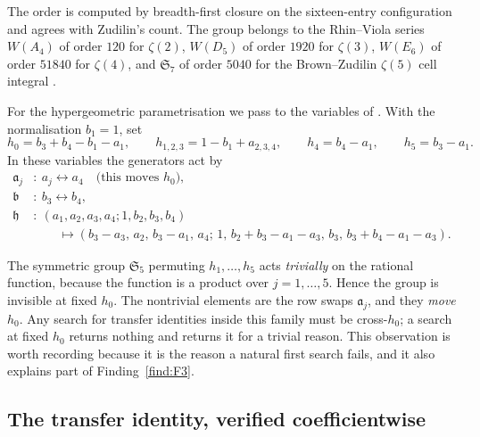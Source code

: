 The order is computed by breadth-first closure on the sixteen-entry configuration and agrees
with Zudilin's count. The group belongs to the Rhin--Viola series $W(A_4)$ of order $120$
for $\zeta(2)$, $W(D_5)$ of order $1920$ for $\zeta(3)$, $W(E_6)$ of order $51840$ for
$\zeta(4)$, and $\mathfrak S_7$ of order $5040$ for the Brown--Zudilin $\zeta(5)$ cell
integral \cite{BrownZudilin2022}.

For the hypergeometric parametrisation we pass to the variables of \cite[\S4]{Zudilin2004}.
With the normalisation $b_1=1$, set
\begin{equation}\label{eq:hvars}
 h_0=b_3+b_4-b_1-a_1,\qquad h_{1,2,3}=1-b_1+a_{2,3,4},\qquad
 h_4=b_4-a_1,\qquad h_5=b_3-a_1 .
\end{equation}
In these variables the generators act by
\begin{equation}\label{eq:hact}
\begin{aligned}
 \mathfrak a_j &:\ a_j\leftrightarrow a_4 \quad\text{(this moves }h_0\text{)},\\
 \mathfrak b &:\ b_3\leftrightarrow b_4,\\
 \mathfrak h &:\ (a_1,a_2,a_3,a_4;1,b_2,b_3,b_4)\\
 &\qquad\mapsto
   (b_3-a_3,\,a_2,\,b_3-a_1,\,a_4;\,1,\,b_2+b_3-a_1-a_3,\,b_3,\,b_3+b_4-a_1-a_3).
\end{aligned}
\end{equation}

\begin{remark}\label{rem:S5trivial}
The symmetric group $\mathfrak S_5$ permuting $h_1,\dots,h_5$ acts \emph{trivially} on the
rational function, because the function is a product over $j=1,\dots,5$. Hence the group is
invisible at fixed $h_0$. The nontrivial elements are the row swaps $\mathfrak a_j$, and
they \emph{move $h_0$}. Any search for transfer identities inside this family must be
cross-$h_0$; a search at fixed $h_0$ returns nothing and returns it for a trivial reason.
This observation is worth recording because it is the reason a natural first search fails,
and it also explains part of Finding~\ref{find:F3}.
\end{remark}

\subsection{The transfer identity, verified coefficientwise}\label{ss:transferver}


